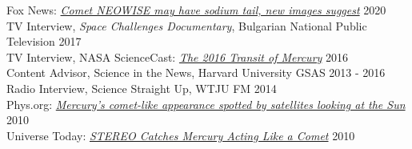 \documentclass[12pt]{report}
\begin{document}
\noindent Fox News: \href{https://www.foxnews.com/science/comet-neowise-may-have-sodium-tail}{{\it Comet NEOWISE may have sodium tail, new images suggest}} \hfill 2020\\
\noindent TV Interview, {\it Space Challenges Documentary}, Bulgarian National Public Television \hfill 2017\\
\noindent TV Interview, NASA ScienceCast: \href{https://www.youtube.com/watch?v=Gibaxh9x7O0&ab_channel=ScienceAtNASA}{{\it The 2016 Transit of Mercury}} \hfill 2016\\
\noindent Content Advisor, Science in the News, Harvard University GSAS \hfill 2013 - 2016\\
\noindent Radio Interview, Science Straight Up, WTJU FM \hfill 2014\\
\noindent Phys.org: \href{https://phys.org/news/2010-09-mercury-comet-like-satellites-sun.html}{{\it Mercury's comet-like appearance spotted by satellites looking at the Sun}} \hfill 2010\\
\noindent Universe Today: \href{https://www.universetoday.com/74279/stereo-catches-mercury-acting-like-a-comet/}{{\it STEREO Catches Mercury Acting Like a Comet}} \hfill 2010\\
\end{document}
